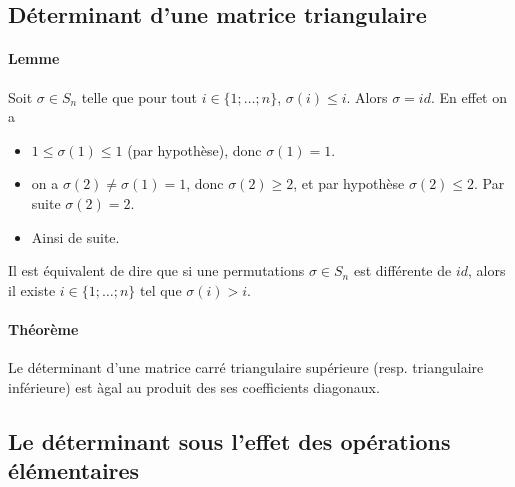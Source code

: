 %
\subsection{Déterminant d'une matrice triangulaire}
%

\paragraph{Lemme} Soit $\sigma \in S_n$ telle que pour tout $i \in \{1; \ldots; n\}$, $\sigma(i) \leq i$. Alors $\sigma  = id$. En effet on a
\begin{itemize}
  \item $1 \leq \sigma(1) \leq 1$ (par hypothèse), donc $\sigma(1) = 1$.
  \item on a $\sigma(2) \neq \sigma(1) = 1$, donc $\sigma(2) \geq 2$, et par hypothèse $\sigma(2) \leq 2$. Par suite $\sigma(2) = 2$.
  \item Ainsi de suite.
\end{itemize}
Il est équivalent de dire que si une permutations $\sigma \in S_n$ est différente de $id$, alors il existe $i \in \{1; \ldots; n\}$ tel que $\sigma(i) > i$.

\paragraph{Théorème} Le déterminant d'une matrice carré triangulaire supérieure (resp. triangulaire inférieure) est àgal au produit des ses coefficients diagonaux.


%
\subsection{Le déterminant sous l'effet des opérations élémentaires}
%
